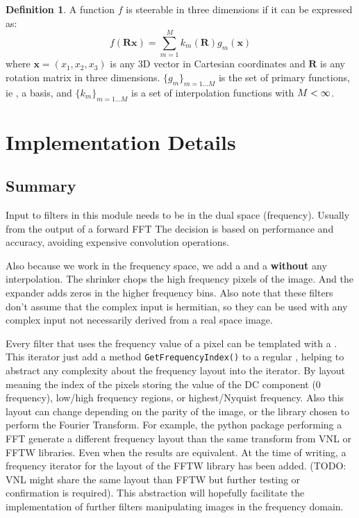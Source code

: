 \documentclass{InsightArticle}
\theoremstyle{definition}
\newtheorem{definition}{Definition}[section]
\begin{document}
\begin{definition}
A function $f$ is steerable in three dimensions if it can be expressed as:
\begin{equation}
  f(\bm{Rx}) = \sum_{m=1}^M k_m(\bm{R})g_m(\bm{x})
\end{equation}
where $\bm{x} = (x_1,x_2,x_3)$ is any 3D vector in Cartesian coordinates and $\bm{R}$ is any rotation matrix in three dimensions.
$\{g_m\}_{m=1...M}$ is the set of primary functions, ie , a basis, and $\{k_m\}_{m=1...M}$ is a set of interpolation functions with $M < \infty$.
\end{definition}

\section{Implementation Details}
\label{sec:Impl}
\subsection{Summary}
\label{sub:Summary}

Input to filters in this module needs to be in the dual space (frequency). Usually from the output of a forward FFT  The decision is based on performance and accuracy, avoiding expensive convolution operations.

Also because we work in the frequency space, we add a  and a  \textbf{without} any interpolation. The shrinker chops the high frequency pixels of the image. And the expander adds zeros in the higher frequency bins. Also note that these filters don't assume that the complex input is hermitian, so they can be used with any complex input not necessarily derived from a real space image.

Every filter that uses the frequency value of a pixel can be templated with a .\newline
This iterator just add  a method \lstinline[columns=fixed]{GetFrequencyIndex()} to a regular , helping to abstract any complexity about the frequency layout into the iterator. By layout meaning the index of the pixels storing the value of the DC component (0 frequency), low/high frequency regions, or highest/Nyquist frequency. Also this layout can change depending on the parity of the image, or the library chosen to perform the Fourier Transform. For example, the python package performing a FFT generate a different frequency layout than the same transform from VNL or FFTW libraries. Even when the results are equivalent. At the time of writing, a frequency iterator for the layout of the FFTW library has been added. (TODO: VNL might share the same layout than FFTW but further testing or confirmation is required).\newline
This abstraction will hopefully facilitate the implementation of further filters manipulating images in the frequency domain.
\end{document}

